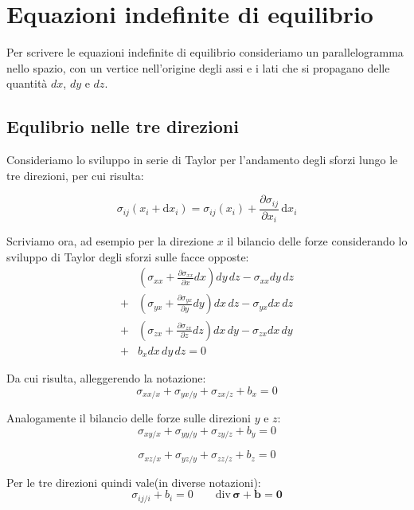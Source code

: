 \section{Equazioni indefinite di equilibrio}

Per scrivere le equazioni indefinite di equilibrio  consideriamo un parallelogramma nello spazio, con un vertice nell'origine degli assi e i lati che si propagano delle quantità $dx$, $dy$ e $dz$. 

\subsection*{Equlibrio nelle tre direzioni}
Consideriamo lo sviluppo in serie di Taylor per l'andamento degli sforzi lungo le tre direzioni, per cui risulta: 

\begin{equation*}
\sigma_{ij}(x_i + \mathrm{d}x_i) = \sigma_{ij}(x_i) + \frac{\partial \sigma_{ij}}{\partial x_i} \, \mathrm{d}x_i
\end{equation*}

Scriviamo ora, ad esempio per la direzione $x$ il bilancio delle forze considerando lo sviluppo di Taylor degli sforzi sulle facce opposte:
\begin{align*}
&(\sigma_{xx} + \frac{\partial \sigma_{xx}}{\partial x} dx) dy\, dz - \sigma_{xx} dy\, dz \\
+ &(\sigma_{yx} + \frac{\partial \sigma_{yx}}{\partial y} dy) dx\, dz - \sigma_{yx} dx\, dz \\
+ &(\sigma_{zx} + \frac{\partial \sigma_{zx}}{\partial z} dz) dx\, dy - \sigma_{zx} dx\, dy \\
+ &b_x dx\, dy\, dz = 0
\end{align*}

Da cui risulta, alleggerendo la notazione:
\begin{equation*}
\sigma_{xx/x}  + \sigma_{yx/y}  + \sigma_{zx/z}  + b_x = 0
\end{equation*}

Analogamente il bilancio delle forze sulle direzioni $y$ e $z$:
\begin{equation*}
\sigma_{xy/x}  + \sigma_{yy/y}  + \sigma_{zy/z}  + b_y = 0
\end{equation*}

\begin{equation*}
\sigma_{xz/x}  + \sigma_{yz/y}  + \sigma_{zz/z}  + b_z = 0
\end{equation*}

Per le tre direzioni quindi vale(in diverse notazioni):
\begin{equation*}
\sigma_{ij/i}    + b_i = 0   \quad \quad  \mathrm{div}\, \boldsymbol{\sigma} + \mathbf{b} = \mathbf{0}
\end{equation*}



